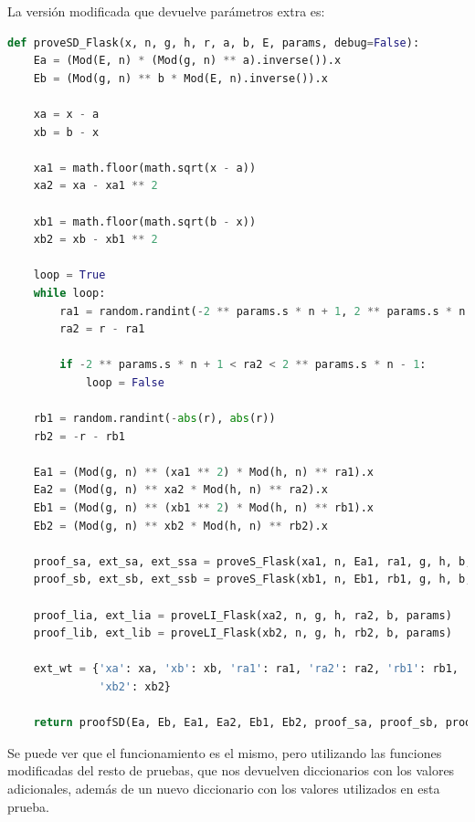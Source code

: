 La versión modificada que devuelve parámetros extra es:
\begin{lstlisting}[language=Python, basicstyle=\footnotesize]
def proveSD_Flask(x, n, g, h, r, a, b, E, params, debug=False):
    Ea = (Mod(E, n) * (Mod(g, n) ** a).inverse()).x
    Eb = (Mod(g, n) ** b * Mod(E, n).inverse()).x

    xa = x - a
    xb = b - x

    xa1 = math.floor(math.sqrt(x - a))
    xa2 = xa - xa1 ** 2

    xb1 = math.floor(math.sqrt(b - x))
    xb2 = xb - xb1 ** 2

    loop = True
    while loop:
        ra1 = random.randint(-2 ** params.s * n + 1, 2 ** params.s * n - 1)
        ra2 = r - ra1

        if -2 ** params.s * n + 1 < ra2 < 2 ** params.s * n - 1:
            loop = False

    rb1 = random.randint(-abs(r), abs(r))
    rb2 = -r - rb1

    Ea1 = (Mod(g, n) ** (xa1 ** 2) * Mod(h, n) ** ra1).x
    Ea2 = (Mod(g, n) ** xa2 * Mod(h, n) ** ra2).x
    Eb1 = (Mod(g, n) ** (xb1 ** 2) * Mod(h, n) ** rb1).x
    Eb2 = (Mod(g, n) ** xb2 * Mod(h, n) ** rb2).x

    proof_sa, ext_sa, ext_ssa = proveS_Flask(xa1, n, Ea1, ra1, g, h, b, params)
    proof_sb, ext_sb, ext_ssb = proveS_Flask(xb1, n, Eb1, rb1, g, h, b, params)

    proof_lia, ext_lia = proveLI_Flask(xa2, n, g, h, ra2, b, params)
    proof_lib, ext_lib = proveLI_Flask(xb2, n, g, h, rb2, b, params)

    ext_wt = {'xa': xa, 'xb': xb, 'ra1': ra1, 'ra2': ra2, 'rb1': rb1, 'rb2': rb2, 'xa1': xa1, 'xa2': xa2, 'xb1': xb1,
              'xb2': xb2}

    return proofSD(Ea, Eb, Ea1, Ea2, Eb1, Eb2, proof_sa, proof_sb, proof_lia, proof_lib), ext_wt, ext_sa, ext_ssa,  ext_sb, ext_ssb, ext_lia, ext_lib
\end{lstlisting}
Se puede ver que el funcionamiento es el mismo, pero utilizando las funciones modificadas del resto de pruebas, que nos devuelven diccionarios con los valores adicionales, además de un nuevo diccionario con los valores utilizados en esta prueba.

